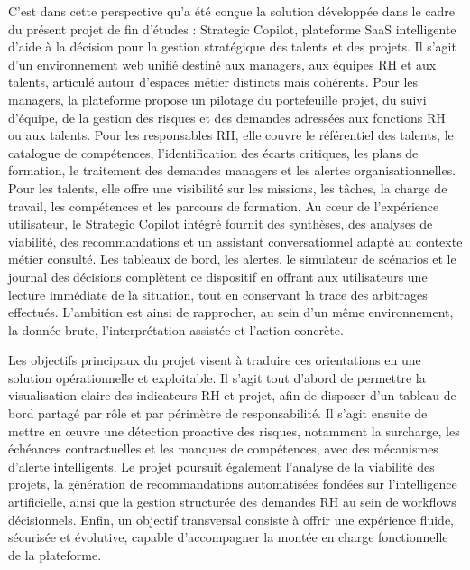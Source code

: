 C'est dans cette perspective qu'a été conçue la solution développée dans le cadre du présent projet de fin d'études : Strategic Copilot, plateforme SaaS intelligente d'aide à la décision pour la gestion stratégique des talents et des projets. Il s'agit d'un environnement web unifié destiné aux managers, aux équipes RH et aux talents, articulé autour d'espaces métier distincts mais cohérents. Pour les managers, la plateforme propose un pilotage du portefeuille projet, du suivi d'équipe, de la gestion des risques et des demandes adressées aux fonctions RH ou aux talents. Pour les responsables RH, elle couvre le référentiel des talents, le catalogue de compétences, l'identification des écarts critiques, les plans de formation, le traitement des demandes managers et les alertes organisationnelles. Pour les talents, elle offre une visibilité sur les missions, les tâches, la charge de travail, les compétences et les parcours de formation. Au cœur de l'expérience utilisateur, le Strategic Copilot intégré fournit des synthèses, des analyses de viabilité, des recommandations et un assistant conversationnel adapté au contexte métier consulté. Les tableaux de bord, les alertes, le simulateur de scénarios et le journal des décisions complètent ce dispositif en offrant aux utilisateurs une lecture immédiate de la situation, tout en conservant la trace des arbitrages effectués. L'ambition est ainsi de rapprocher, au sein d'un même environnement, la donnée brute, l'interprétation assistée et l'action concrète.

Les objectifs principaux du projet visent à traduire ces orientations en une solution opérationnelle et exploitable. Il s'agit tout d'abord de permettre la visualisation claire des indicateurs RH et projet, afin de disposer d'un tableau de bord partagé par rôle et par périmètre de responsabilité. Il s'agit ensuite de mettre en œuvre une détection proactive des risques, notamment la surcharge, les échéances contractuelles et les manques de compétences, avec des mécanismes d'alerte intelligents. Le projet poursuit également l'analyse de la viabilité des projets, la génération de recommandations automatisées fondées sur l'intelligence artificielle, ainsi que la gestion structurée des demandes RH au sein de workflows décisionnels. Enfin, un objectif transversal consiste à offrir une expérience fluide, sécurisée et évolutive, capable d'accompagner la montée en charge fonctionnelle de la plateforme.

